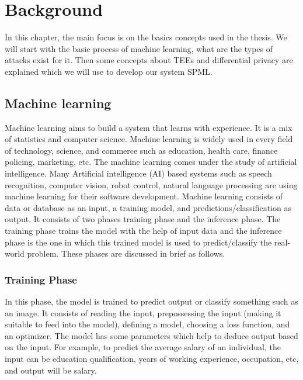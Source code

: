 \chapter{Background}
\label{sec:background}
In this chapter, the main focus is on the basics concepts used in the thesis. We will start with the basic process of machine learning, what are the types of attacks exist for it. Then some concepts about TEEs and differential privacy are explained which we will use to develop our system SPML.
\section{Machine learning}
Machine learning \cite{65} aims to build a system that learns with experience. It is a mix of statistics and computer science. Machine learning is widely used in every field of technology, science, and commerce such as education, health care, finance policing, marketing, etc. The machine learning comes under the study of artificial intelligence. Many Artificial intelligence (AI) based systems such as speech recognition, computer vision, robot control, natural language processing are using machine learning for their software development. Machine learning consists of data or database as an input, a training model, and predictions/classification as output. It consists of two phases training phase and the inference phase. The training phase trains the model with the help of input data and the inference phase is the one in which this trained model is used to predict/classify the real-world problem. These phases are discussed in brief as follows.

\subsection{Training Phase}
In this phase, the model is trained to predict output or classify something such as an image. It consists of reading the input, prepossessing the input (making it suitable to feed into the model), defining a model, choosing a loss function, and an optimizer. The model has some parameters which help to deduce output based on the input. For example, to predict the average salary of an individual, the input can be education qualification, years of working experience, occupation, etc, and output will be salary. 

